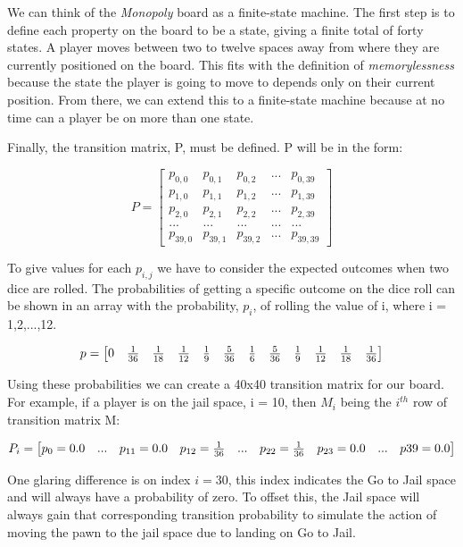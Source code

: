 \documentclass{article}
\begin{document}
We can think of the \textit{Monopoly} board as a finite-state machine.  The first step is to define each property on the board to be a state, giving a finite total of forty states.  A player moves between two to twelve spaces away from where they are currently positioned on the board.  This fits with the definition of \textit{memorylessness} because the state the player is going to move to depends only on their current position.  From there, we can extend this to a finite-state machine because at no time can a player be on more than one state.

Finally, the transition matrix, P, must be defined.  P will be in the form:

$$
P=
\begin{bmatrix}
p_{0,0} & p_{0,1} & p_{0,2} & ... & p_{0,39}\\
p_{1,0} & p_{1,1} & p_{1,2} & ... & p_{1,39}\\
p_{2,0} & p_{2,1} & p_{2,2} & ... & p_{2,39}\\
... & ... & ... & ... & ...\\
p_{39,0} & p_{39,1} & p_{39,2} & ... & p_{39,39}
\end{bmatrix}
$$

To give values for each $p_{i,j}$ we have to consider the expected outcomes when two dice are rolled.  The probabilities of getting a specific outcome on the dice roll can be shown in an array with the probability, $p_i$, of rolling the value of i, where i = 1,2,...,12.

$$
\setcounter{MaxMatrixCols}{20}
p=
\begin{bmatrix}
0&\frac{1}{36}&\frac{1}{18}&\frac{1}{12}&\frac{1}{9}&\frac{5}{36}&\frac{1}{6}&\frac{5}{36}&\frac{1}{9}&\frac{1}{12}&\frac{1}{18}&\frac{1}{36}\\
\end{bmatrix}
$$

Using these probabilities we can create a 40x40 transition matrix for our board.  For example, if a player is on the jail space, i = 10,  then $M_i$ being the $i^{th}$ row of transition matrix M:

$$
\setcounter{MaxMatrixCols}{20}
P_i=
\begin{bmatrix}
p_0 = 0.0& ... & p_{11} = 0.0 & p_{12} = \frac{1}{36}&...& p_{22} = \frac{1}{36}& p_{23} = 0.0 & ... & p{39} = 0.0\\
\end{bmatrix}
$$

One glaring difference is on index $i = 30$, this index indicates the Go to Jail space and will always have a probability of zero.  To offset this, the Jail space will always gain that corresponding transition probability to simulate the action of moving the pawn to the jail space due to landing on Go to Jail.  
\end{document}
